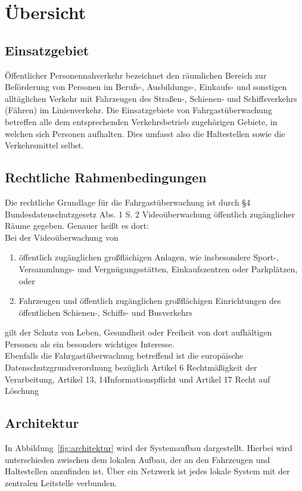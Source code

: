 \section{Übersicht}
\subsection{Einsatzgebiet}
Öffentlicher Personennahverkehr bezeichnet den \glqq{} räumlichen Bereich zur Beförderung von Personen im Berufs-,
Ausbildungs-, Einkaufs- und sonstigen alltäglichen Verkehr mit Fahrzeugen des Straßen-, Schienen- und Schiffsverkehrs (Fähren) im Linienverkehr.
\grqq{} \cite{Dr.FriedrichvonStackelbergDr.RobertMalina.2018}
Die Einsatzgebiete von Fahrgastüberwachung betreffen alle dem entsprechenden Verkehrsbetrieb zugehörigen Gebiete, in welchen sich Personen aufhalten.
Dies umfasst also die Haltestellen sowie die Verkehrsmittel selbst.
\subsection{Rechtliche Rahmenbedingungen}
Die rechtliche Grundlage für die Fahrgastüberwachung ist durch §4 Bundesdatenschutzgesetz Abs. 1 S. 2 \glqq{} Videoüberwachung öffentlich zugänglicher Räume\grqq{}
gegeben. Genauer heißt es dort:\\
\glqq{}Bei der Videoüberwachung von
\begin{enumerate}
    \item öffentlich zugänglichen großflächigen Anlagen, wie insbesondere Sport-,\\ Versammlungs- und Vergnügungsstätten, Einkaufszentren oder Parkplätzen, oder
    \item Fahrzeugen und öffentlich zugänglichen großflächigen Einrichtungen des öffentlichen Schienen-, Schiffs- und Busverkehrs
\end{enumerate}
gilt der Schutz von Leben, Gesundheit oder Freiheit von dort aufhältigen Personen als ein besonders wichtiges Interesse.\grqq{} \cite{Bundestag.2018}\\
Ebenfalls die Fahrgastüberwachung betreffend ist die europäische Datenschutzgrundverordnung bezüglich Artikel 6 \glqq{}Rechtmäßigkeit der Verarbeitung\grqq{},
Artikel 13, 14\glqq{}Informationspflicht\grqq{} und Artikel 17 \glqq{}Recht auf Löschung\grqq{} \cite{EuropaischeUnion.}

\subsection{Architektur}
In Abbildung~\ref{fig:architektur} wird der Systemaufbau dargestellt. Hierbei wird unterschieden zwischen dem lokalen Aufbau, der an den Fahrzeugen und Haltestellen
anzufinden ist. Über ein Netzwerk ist jedes lokale System mit der zentralen Leitstelle verbunden.

